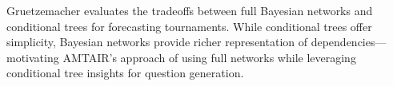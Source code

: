\documentclass[
  11pt,
  letterpaper,
  openany]{book}
\begin{document}
Gruetzemacher \textcite{gruetzemacher2022} evaluates the tradeoffs
between full Bayesian networks and conditional trees for forecasting
tournaments. While conditional trees offer simplicity, Bayesian networks
provide richer representation of dependencies---motivating AMTAIR's
approach of using full networks while leveraging conditional tree
insights for question generation.

\begin{figure}

\end{figure}
\end{document}

